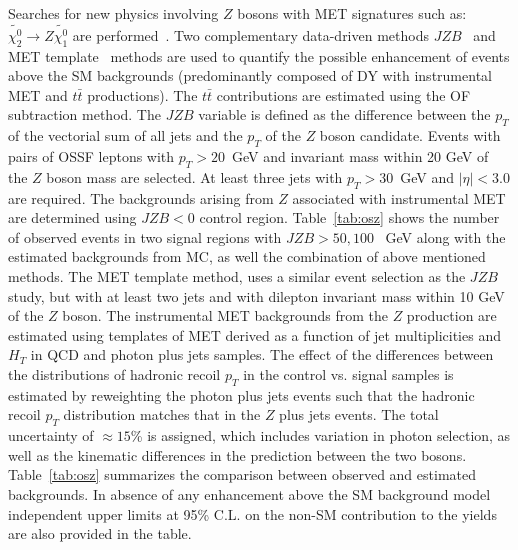 \documentclass{PoS}
\begin{document}
Searches for new physics involving $Z$ bosons with MET signatures such as: $\tilde{\chi^{0}_{2}} \rightarrow Z \tilde{\chi^{0}_{1}}$ are performed~\cite{bib:osz1, bib:osz2}. 
Two complementary
data-driven methods $JZB$~\cite{bib:osz1} and MET template~\cite{bib:osz2} methods are used to quantify the possible enhancement of events above the SM backgrounds (predominantly
composed of DY with instrumental MET and $t\bar{t}$ productions). The $t\bar{t}$ contributions are estimated using the OF subtraction method. 
The $JZB$ variable is defined as the difference between the $p_T$ of the vectorial sum of all 
jets and the $p_T$ of the $Z$ boson candidate. Events with pairs of OSSF leptons with $p_T > 20$~GeV and invariant mass within 20 GeV of the $Z$ 
boson mass are selected. At least three jets with $p_T > 30$~GeV and $|\eta| < 3.0$ are required. The backgrounds arising from $Z$ associated with instrumental MET 
are determined using $JZB < 0$ control region. Table~\ref{tab:osz}
shows the number of observed events in two signal regions with $JZB > 50, 100$~ GeV along with the estimated backgrounds from MC, as well the combination
of above mentioned methods. 
The MET template method, uses a similar event selection as the $JZB$ study, but with at least two jets and with dilepton invariant mass within 10 GeV of the $Z$ boson.
The instrumental MET backgrounds from the $Z$ production are estimated using templates of MET derived as a function of jet multiplicities and $H_T$ in 
QCD and photon plus jets samples. The effect of the differences between the distributions of hadronic recoil $p_T$ in the control vs. signal
samples is estimated by reweighting the photon plus jets events such that the hadronic recoil $p_T$ distribution matches that in the $Z$ plus jets events.
The total uncertainty of $\approx 15$\% is assigned, which includes variation in photon selection, as well as the kinematic differences in the prediction 
between the two bosons. Table~\ref{tab:osz} summarizes the comparison between observed and estimated backgrounds.
In absence of any enhancement above the SM background model independent upper limits at 95\% C.L. on the non-SM contribution to the yields are also provided in the table.
\end{document}
